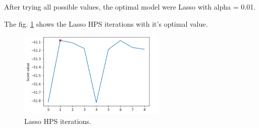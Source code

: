 \documentclass[journal]{IEEEtran} %
\begin{document}
After trying all possible values, the optimal model were Lasso with alpha = 0.01.

The fig. \ref{fig:linear_h} shows the Lasso HPS iterations with it's optimal value.

\begin{figure}[htp]
    \centering
    \includegraphics[width=7cm]{Project2-Report_FAA/figures/linear_hyper.png}
    \caption{Lasso HPS iterations.}
    \label{fig:linear_h}
\end{figure}
\end{document}
